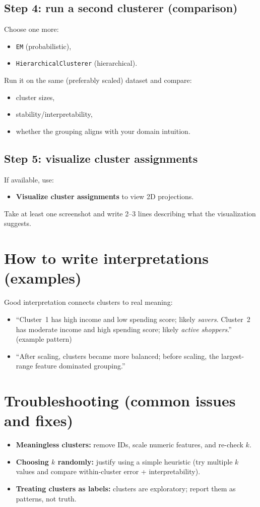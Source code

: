 \documentclass[11pt]{article}
\begin{document}
\subsection{Step 4: run a second clusterer (comparison)}
Choose one more:
\begin{itemize}[leftmargin=*]
  \item \texttt{EM} (probabilistic),
  \item \texttt{HierarchicalClusterer} (hierarchical).
\end{itemize}
Run it on the same (preferably scaled) dataset and compare:
\begin{itemize}[leftmargin=*]
  \item cluster sizes,
  \item stability/interpretability,
  \item whether the grouping aligns with your domain intuition.
\end{itemize}

\subsection{Step 5: visualize cluster assignments}
If available, use:
\begin{itemize}[leftmargin=*]
  \item \textbf{Visualize cluster assignments} to view 2D projections.
\end{itemize}
Take at least one screenshot and write 2--3 lines describing what the visualization suggests.

\section{How to write interpretations (examples)}
Good interpretation connects clusters to real meaning:
\begin{itemize}[leftmargin=*]
  \item ``Cluster~1 has high income and low spending score; likely \emph{savers}. Cluster~2 has moderate income and high spending score; likely \emph{active shoppers}.'' (example pattern)
  \item ``After scaling, clusters became more balanced; before scaling, the largest-range feature dominated grouping.''
\end{itemize}

\section{Troubleshooting (common issues and fixes)}
\begin{itemize}[leftmargin=*]
  \item \textbf{Meaningless clusters:} remove IDs, scale numeric features, and re-check $k$.
  \item \textbf{Choosing $k$ randomly:} justify using a simple heuristic (try multiple $k$ values and compare within-cluster error + interpretability).
  \item \textbf{Treating clusters as labels:} clusters are exploratory; report them as patterns, not truth.
\end{itemize}
\end{document}
